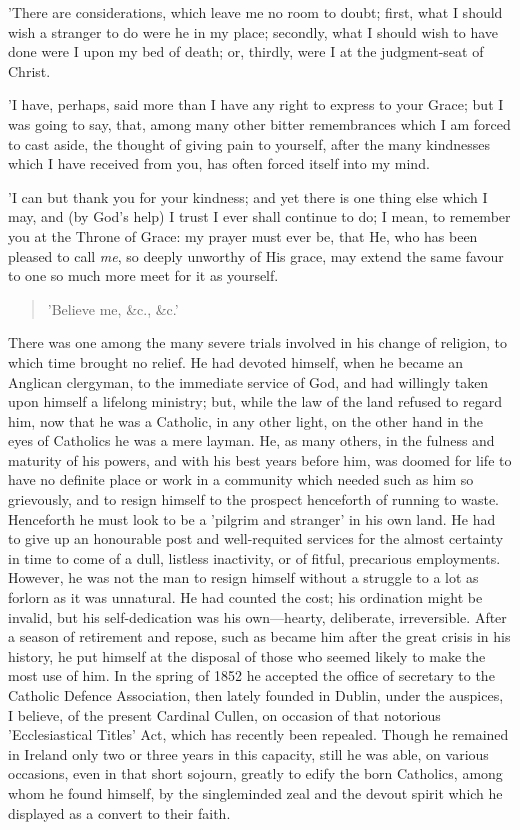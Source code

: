 'There are considerations, which leave me no
room to doubt; first, what I should wish a stranger to do were he in
my place; secondly, what I should wish to have done were I upon my bed
of death; or, thirdly, were I at the judgment-seat of Christ.

'I have, perhaps, said more than I have any
right to express to your Grace; but I was going to say, that, among
many other bitter remembrances which I am forced to cast aside, the
thought of giving pain to yourself, after the many kindnesses which I
have received from you, has often forced itself into my mind.

'I can but thank you for your kindness; and yet
there is one thing else which I may, and (by God's help) I trust I
ever shall continue to do; I mean, to remember you at the Throne of
Grace: my prayer must ever be, that He, who has been pleased to call \emph{me},
so deeply unworthy of His grace, may extend the same favour to one so
much more meet for it as yourself.

\begin{quote}

'Believe me, \&c., \&c.'
\end{quote}

There was one among the many severe trials
involved in his change of religion, to which time brought no relief.
He had devoted himself, when he became an Anglican clergyman, to the
immediate service of God, and had willingly taken upon himself a
lifelong ministry; but, while the law of the land refused to regard
him, now that he was a Catholic, in any other light, on the other hand
in the eyes of Catholics he was a mere layman. He, as many others, in
the fulness and maturity of his powers, and with his best years before
him, was doomed for life to have no definite place or work in a
community which needed such as him so grievously, and to resign
himself to the prospect henceforth of running to waste. Henceforth he
must look to be a 'pilgrim and stranger' in his own land. He had
to give up an honourable post and well-requited services for the
almost certainty in time to come of a dull, listless inactivity, or of
fitful, precarious employments. However, he was not the man to resign
himself without a struggle to a lot as forlorn as it was unnatural. He
had counted the cost; his ordination might be invalid, but his
self-dedication was his own—hearty, deliberate, irreversible. After
a season of retirement and repose, such as became him after the great
crisis in his history, he put himself at the disposal of those who
seemed likely to make the most use of him. In the spring of 1852 he
accepted the office of secretary to the Catholic Defence Association,
then lately founded in Dublin, under the auspices, I believe, of the
present Cardinal Cullen, on occasion of that notorious 'Ecclesiastical Titles' Act, which has recently been repealed.
Though he remained in Ireland only two or three years in this
capacity, still he was able, on various occasions, even in that short
sojourn, greatly to edify the born Catholics, among whom he found
himself, by the singleminded zeal and the devout spirit which he
displayed as a convert to their faith.

